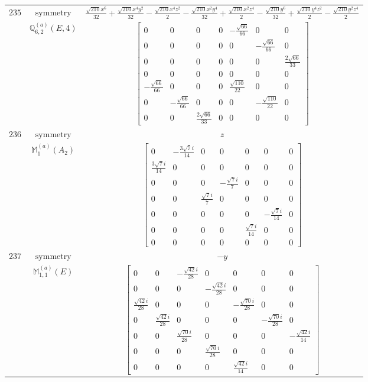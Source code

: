 \documentclass[fleqn,8pt,landscape]{jsarticle}
\begin{document}
\begin{longtable}{ccc}
$ 235 $ & $ \text{symmetry} $ & $ \frac{\sqrt{210} x^{6}}{32} + \frac{\sqrt{210} x^{4} y^{2}}{32} - \frac{\sqrt{210} x^{4} z^{2}}{2} - \frac{\sqrt{210} x^{2} y^{4}}{32} + \frac{\sqrt{210} x^{2} z^{4}}{2} - \frac{\sqrt{210} y^{6}}{32} + \frac{\sqrt{210} y^{4} z^{2}}{2} - \frac{\sqrt{210} y^{2} z^{4}}{2} $ \\
$  $ & $ \mathbb{Q}_{6,2}^{(a)}(E,4) $ & $ \begin{bmatrix} 0 & 0 & 0 & 0 & - \frac{\sqrt{66}}{66} & 0 & 0 \\ 0 & 0 & 0 & 0 & 0 & - \frac{\sqrt{66}}{66} & 0 \\ 0 & 0 & 0 & 0 & 0 & 0 & \frac{2 \sqrt{66}}{33} \\ 0 & 0 & 0 & 0 & 0 & 0 & 0 \\ - \frac{\sqrt{66}}{66} & 0 & 0 & 0 & \frac{\sqrt{110}}{22} & 0 & 0 \\ 0 & - \frac{\sqrt{66}}{66} & 0 & 0 & 0 & - \frac{\sqrt{110}}{22} & 0 \\ 0 & 0 & \frac{2 \sqrt{66}}{33} & 0 & 0 & 0 & 0 \end{bmatrix} $ \\ \hline
$ 236 $ & $ \text{symmetry} $ & $ z $ \\
$  $ & $ \mathbb{M}_{1}^{(a)}(A_{2}) $ & $ \begin{bmatrix} 0 & - \frac{3 \sqrt{7} i}{14} & 0 & 0 & 0 & 0 & 0 \\ \frac{3 \sqrt{7} i}{14} & 0 & 0 & 0 & 0 & 0 & 0 \\ 0 & 0 & 0 & - \frac{\sqrt{7} i}{7} & 0 & 0 & 0 \\ 0 & 0 & \frac{\sqrt{7} i}{7} & 0 & 0 & 0 & 0 \\ 0 & 0 & 0 & 0 & 0 & - \frac{\sqrt{7} i}{14} & 0 \\ 0 & 0 & 0 & 0 & \frac{\sqrt{7} i}{14} & 0 & 0 \\ 0 & 0 & 0 & 0 & 0 & 0 & 0 \end{bmatrix} $ \\ \hline
$ 237 $ & $ \text{symmetry} $ & $ - y $ \\
$  $ & $ \mathbb{M}_{1,1}^{(a)}(E) $ & $ \begin{bmatrix} 0 & 0 & - \frac{\sqrt{42} i}{28} & 0 & 0 & 0 & 0 \\ 0 & 0 & 0 & - \frac{\sqrt{42} i}{28} & 0 & 0 & 0 \\ \frac{\sqrt{42} i}{28} & 0 & 0 & 0 & - \frac{\sqrt{70} i}{28} & 0 & 0 \\ 0 & \frac{\sqrt{42} i}{28} & 0 & 0 & 0 & - \frac{\sqrt{70} i}{28} & 0 \\ 0 & 0 & \frac{\sqrt{70} i}{28} & 0 & 0 & 0 & - \frac{\sqrt{42} i}{14} \\ 0 & 0 & 0 & \frac{\sqrt{70} i}{28} & 0 & 0 & 0 \\ 0 & 0 & 0 & 0 & \frac{\sqrt{42} i}{14} & 0 & 0 \end{bmatrix} $ \\ \hline

\end{longtable}
\end{document}
